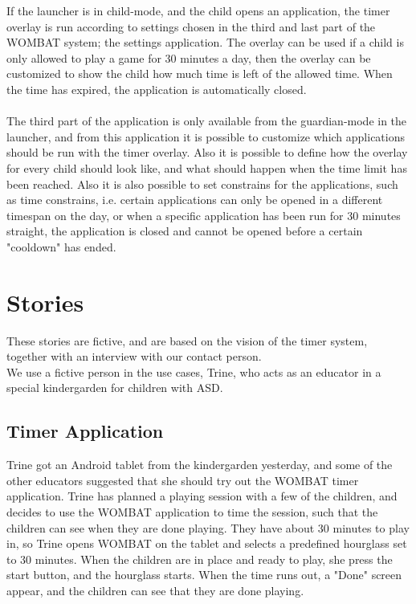 	If the launcher is in child-mode, and the child opens an application, the timer overlay is run according to settings chosen in the third and last part of the WOMBAT system; the settings application. The overlay can be used if a child is only allowed to play a game for 30 minutes a day, then the overlay can be customized to show the child how much time is left of the allowed time. When the time has expired, the application is automatically closed.\\ \\
	The third part of the application is only available from the guardian-mode in the launcher, and from this application it is possible to customize which applications should be run with the timer overlay. Also it is possible to define how the overlay for every child should look like, and what should happen when the time limit has been reached. Also it is also possible to set constrains for the applications, such as time constrains, i.e. certain applications can only be opened in a different timespan on the day, or when a specific application has been run for 30 minutes straight, the application is closed and cannot be opened before a certain "cooldown" has ended.

\section{Stories}
These stories are fictive, and are based on the vision of the timer system, together with an interview with our contact person.\\
We use a fictive person in the use cases, Trine, who acts as an educator in a special kindergarden for children with ASD.

	\subsection*{Timer Application}
	Trine got an Android tablet from the kindergarden yesterday, and some of the other educators suggested that she should try out the WOMBAT timer application. Trine has planned a playing session with a few of the children, and decides to use the WOMBAT application to time the session, such that the children can see when they are done playing. They have about 30 minutes to play in, so Trine opens WOMBAT on the tablet and selects a predefined hourglass set to 30 minutes. When the children are in place and ready to play, she press the start button, and the hourglass starts. When the time runs out, a "Done" screen appear, and the children can see that they are done playing.

